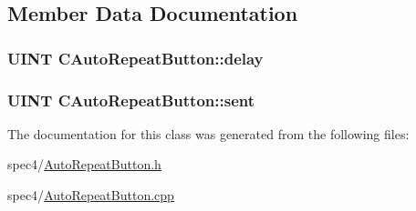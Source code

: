 \subsection{Member Data Documentation}
\hypertarget{classCAutoRepeatButton_ad89ab7692b00411f91e7a78e6f98a466}{
\subsubsection[{delay}]{\setlength{\rightskip}{0pt plus 5cm}UINT {\bf CAutoRepeatButton::delay}}}
\label{classCAutoRepeatButton_ad89ab7692b00411f91e7a78e6f98a466}
\hypertarget{classCAutoRepeatButton_ac0ea1793c4567d7323ea9dca34f3519d}{
\subsubsection[{sent}]{\setlength{\rightskip}{0pt plus 5cm}UINT {\bf CAutoRepeatButton::sent}}}
\label{classCAutoRepeatButton_ac0ea1793c4567d7323ea9dca34f3519d}


The documentation for this class was generated from the following files:\begin{DoxyCompactItemize}
\item 
spec4/\hyperlink{AutoRepeatButton_8h}{AutoRepeatButton.h}\item 
spec4/\hyperlink{AutoRepeatButton_8cpp}{AutoRepeatButton.cpp}\end{DoxyCompactItemize}
